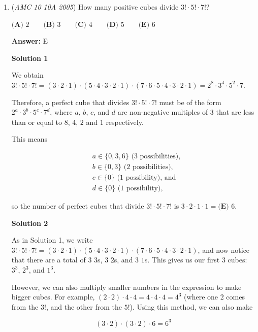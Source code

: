 \begin{enumerate}
 -JinhoK

 


	\item (\textit{AMC 10 10A 2005}) How many positive cubes divide $3! \cdot 5! \cdot 7!$?


 $\textbf{(A) } 2\qquad \textbf{(B) } 3\qquad \textbf{(C) } 4\qquad \textbf{(D) } 5\qquad \textbf{(E) } 6$

 \textbf{Answer: }E



\textbf{Solution 1}

We obtain $3! \cdot 5! \cdot 7! = (3\cdot2\cdot1) \cdot (5\cdot4\cdot3\cdot2\cdot1) \cdot (7\cdot6\cdot5\cdot4\cdot3\cdot2\cdot1) = 2^{8}\cdot3^{4}\cdot5^{2}\cdot7$.

 Therefore, a perfect cube that divides $3! \cdot 5! \cdot 7!$ must be of the form $2^{a}\cdot3^{b}\cdot5^{c}\cdot7^{d}$, where $a$, $b$, $c$, and $d$ are non-negative multiples of $3$ that are less than or equal to $8$, $4$, $2$ and $1$ respectively. 

 This means 

 
 \begin{align*}&a\in\{0,3,6\} \text{ (} 3 \text{ possibilities),} \\ &b\in\{0,3\} \text{ (} 2 \text{ possibilities),} \\ &c\in\{0\} \text{ (} 1 \text{ possibility), and} \\ &d\in\{0\} \text{ (} 1 \text{ possibility),}\end{align*}


 so the number of perfect cubes that divide $3! \cdot 5! \cdot 7!$ is $3\cdot2\cdot1\cdot1 = \boxed{\textbf{(E) } 6}$.

 



\textbf{Solution 2}

As in Solution 1, we write $3! \cdot 5! \cdot 7! = (3\cdot2\cdot1) \cdot (5\cdot4\cdot3\cdot2\cdot1) \cdot (7\cdot6\cdot5\cdot4\cdot3\cdot2\cdot1)$, and now notice that there are a total of $3$ $3$s, $3$ $2$s, and $3$ $1$s. This gives us our first $3$ cubes: $3^3$, $2^3$, and $1^3$. 

 However, we can also multiply smaller numbers in the expression to make bigger cubes. For example, $(2 \cdot 2) \cdot 4 \cdot 4 = 4 \cdot 4 \cdot 4 = 4^3$ (where one 2 comes from the $3!$, and the other from the $5!$). Using this method, we can also make

 
 \[(3 \cdot 2) \cdot (3 \cdot 2) \cdot 6 = 6^3\]


\end{enumerate}
